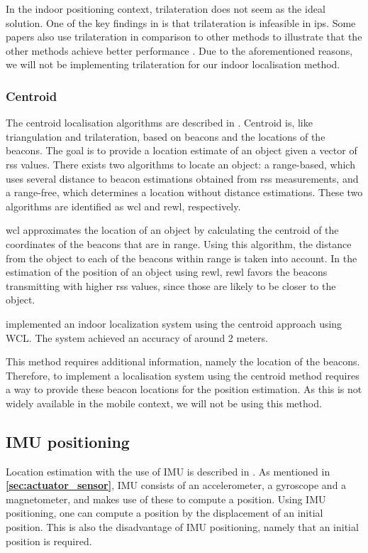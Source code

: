 In the indoor positioning context, trilateration does not seem as the ideal solution\cite{trilateration02}. One of the key findings in \cite{trilateration02} is that trilateration is infeasible in \gls{ips}. Some papers also use trilateration in comparison to other methods to illustrate that the other methods achieve better performance \cite{triangulation03trilat, trilateration01}. Due to the aforementioned reasons, we will not be implementing trilateration for our indoor localisation method.


\subsubsection{Centroid}
The centroid localisation algorithms are described in \cite{5759777}. Centroid is, like triangulation and trilateration, based on beacons and the locations of the beacons. The goal is to provide a location estimate of an object given a vector of \gls{rss} values. There exists two algorithms to locate an object: a range-based, which uses several distance to beacon estimations obtained from \gls{rss} measurements, and a range-free, which determines a location without distance estimations. These two algorithms are identified as \gls{wcl}\cite{5759777} and \gls{rewl}\cite{5759777}, respectively.

\gls{wcl} approximates the location of an object by calculating the centroid of the coordinates of the beacons that are in range. Using this algorithm, the distance from the object to each of the beacons within range is taken into account.
In the estimation of the position of an object using \gls{rewl}, \gls{rewl} favors the beacons transmitting with higher \gls{rss} values, since those are likely to be closer to the object.

\cite{7536951} implemented an indoor localization system using the centroid approach using WCL. The system achieved an accuracy of around 2 meters.

This method requires additional information, namely the location of the beacons. Therefore, to implement a localisation system using the centroid method requires a way to provide these beacon locations for the position estimation. As this is not widely available in the mobile context, we will not be using this method.

\subsection{IMU positioning} \label{sec:IMUPositioning}
Location estimation with the use of IMU is described in \cite{IMUPositioning}. As mentioned in \textbf{\autoref{sec:actuator_sensor}}, IMU consists of an accelerometer, a gyroscope and a magnetometer, and makes use of these to compute a position. Using IMU positioning, one can compute a position by the displacement of an initial position. This is also the disadvantage of IMU positioning, namely that an initial position is required.

